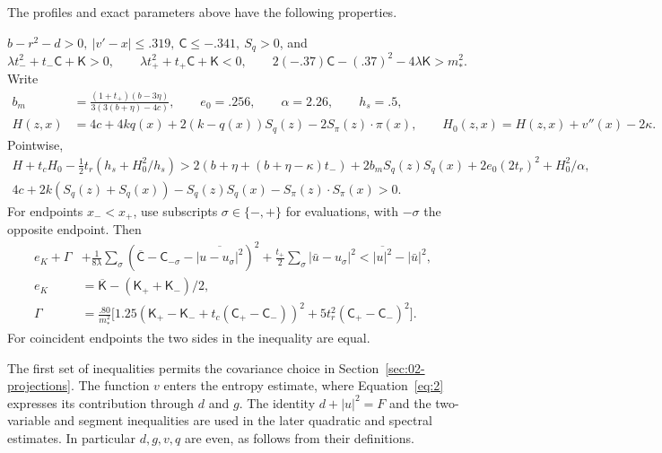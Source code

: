 \begin{proposition}\label{prop:scalar-input}
The profiles and exact parameters above have the following properties.

\noindent\textbullet\quad \(b-r^2-d>0,\ |v'-x|\le .319,\ \mathsf C\le-.341,\ S_q>0\), and
\[
 \lambda t_-^2+t_-\mathsf C+\mathsf K>0,\qquad
 \lambda t_+^2+t_+\mathsf C+\mathsf K<0,\qquad
 2(-.37)\mathsf C-(.37)^2-4\lambda\mathsf K>m_*^2 .
\]
\noindent\textbullet\quad Write
\[
 \begin{aligned}
 b_m&=\frac{(1+t_+)(b-3\eta)}{3(3(b+\eta)-4c)},\qquad
 e_0=.256,\qquad \alpha=2.26,\qquad h_s=.5,\\
 H(z,x)&=4c+4kq(x)+2(k-q(x))S_q(z)-2S_\pi(z)\cdot\pi(x),\qquad
 H_0(z,x)=H(z,x)+v''(x)-2\kappa .
 \end{aligned}
\]
Pointwise,
\[
\begin{aligned}
 H+t_c H_0-\tfrac12t_r(h_s+H_0^2/h_s) >
  2(b+\eta+(b+\eta-\kappa)t_-)+2 b_m S_q(z)S_q(x)+2e_0(2t_r)^2+H_0^2/\alpha,\\
 4c+2k(S_q(z)+S_q(x))-S_q(z)S_q(x)-S_\pi(z)\cdot S_\pi(x) >0 .
\end{aligned}                                                       \tag{3}\label{eq:3}
\]
\noindent\textbullet\quad For endpoints \(x_-<x_+\), use subscripts \(\sigma\in\{-,+\}\) for evaluations, with \(-\sigma\) the opposite endpoint. Then
\[
\begin{aligned}
 e_K+\Gamma&+
 \frac{1}{8\lambda}\sum_\sigma
 (\overline{\mathsf C}-\mathsf C_{-\sigma}-\overline{|u-u_\sigma|^2})^2
 +\frac{t_+}{2}\sum_\sigma|\bar u-u_\sigma|^2
 <\overline{|u|^2}-|\bar u|^2,\\
 e_K&=\overline{\mathsf K}-(\mathsf K_++\mathsf K_-)/2,\\
 \Gamma&=\frac{.80}{m_*^2}
 \big[1.25(\mathsf K_+-\mathsf K_-+t_c(\mathsf C_+-\mathsf C_-))^2+
           5 t_r^2(\mathsf C_+-\mathsf C_-)^2\big].
\end{aligned}                                                       \tag{4}\label{eq:4}
\]
For coincident endpoints the two sides in the inequality are equal.
\end{proposition}

The first set of inequalities permits the covariance choice in Section~\ref{sec:02-projections}. The function \(v\) enters the entropy estimate, where Equation~\eqref{eq:2} expresses its contribution through \(d\) and \(g\). The identity \(d+|u|^2=F\) and the two-variable and segment inequalities are used in the later quadratic and spectral estimates. In particular \(d,g,v,q\) are even, as follows from their definitions.


